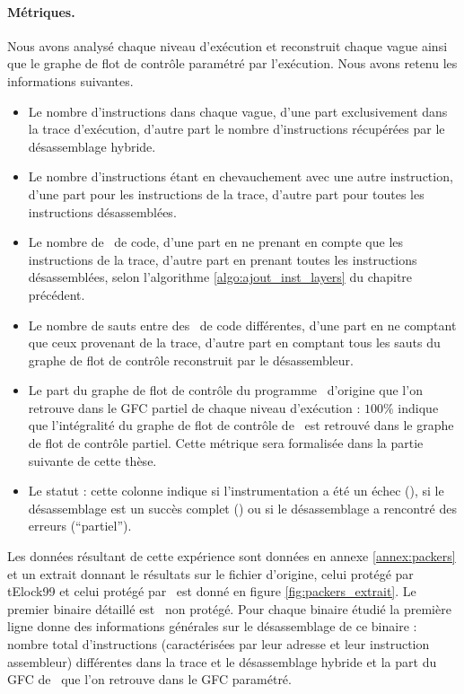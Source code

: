 \paragraph{Métriques.}
Nous avons analysé chaque niveau d'exécution et reconstruit chaque vague ainsi que le graphe de flot de contrôle paramétré par l'exécution. Nous avons retenu les informations suivantes.
\begin{itemize}
 \item Le nombre d'instructions dans chaque vague, d'une part exclusivement dans la trace d'exécution, d'autre part le nombre d'instructions récupérées par le désassemblage hybride.
 \item Le nombre d'instructions étant en chevauchement avec une autre instruction, d'une part pour les instructions de la trace, d'autre part pour toutes les instructions désassemblées.
 \item Le nombre de \layers\ de code, d'une part en ne prenant en compte que les instructions de la trace, d'autre part en prenant toutes les instructions désassemblées, selon l'algorithme \ref{algo:ajout_inst_layers} du chapitre précédent.
 \item Le nombre de sauts entre des \layers\ de code différentes, d'une part en ne comptant que ceux provenant de la trace, d'autre part en comptant tous les sauts du graphe de flot de contrôle reconstruit par le désassembleur.
 \item Le part du graphe de flot de contrôle du programme \hostname\ d'origine que l'on retrouve dans le GFC partiel de chaque niveau d'exécution : $100\%$ indique que l'intégralité du graphe de flot de contrôle de \hostname\ est retrouvé dans le graphe de flot de contrôle partiel. Cette métrique sera formalisée dans la partie suivante de cette thèse.
 \item Le statut : cette colonne indique si l'instrumentation a été un échec (\checkf), si le désassemblage est un succès complet (\checkv) ou si le désassemblage a rencontré des erreurs (``partiel'').
\end{itemize}
Les données résultant de cette expérience sont données en annexe \ref{annex:packers} et un extrait donnant le résultats sur le fichier d'origine, celui protégé par tElock99 et celui protégé par \upx\ est donné en figure \ref{fig:packers_extrait}.
Le premier binaire détaillé est \hostname\ non protégé. Pour chaque binaire étudié la première ligne donne des informations générales sur le désassemblage de ce binaire : nombre total d'instructions (caractérisées par leur adresse et leur instruction assembleur) différentes dans la trace et le désassemblage hybride et la part du GFC de \hostname\ que l'on retrouve dans le GFC paramétré.

